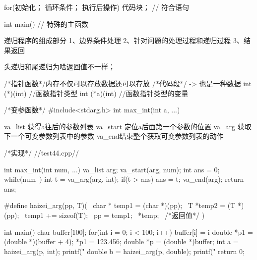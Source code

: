 for(初始化； 循环条件； 执行后操作)
{
	代码块； //  符合语句	
}


int main() // 特殊的主函数


递归程序的组成部分
1、边界条件处理
2、针对问题的处理过程和递归过程
3、结果返回

头递归和尾递归为啥返回值不一样；

/*指针函数*/内存不仅可以存放数据还可以存放  /*代码段*/ -> 也是一种数据 
int (*)(int) //函数指针类型
int (*a)(int)  //函数指针类型的变量

/*变参函数*/
#include<stdarg.h>
int max_int(int a, ...)

va_list 获得a往后的参数列表
va_start 定位a后面第一个参数的位置
va_arg 获取下一个可变参数列表中的参数
va_end结束整个获取可变参数列表的动作

/*实现*/  //test44.cpp//

int max_int(int num, ...)
{
	va_list arg;
	va_start(arg, num);
	int ans = 0;
	while(num--)
	{
		int t = va_arg(arg, int);
		if(t > ans)
			ans = t;
	}
	va_end(arg);
	return ans;
}


#define haizei_arg(pp, T)({ \
	char * temp1 = (char *)(pp); \
	T *temp2 = (T *)(pp); \
	temp1 += sizeof(T); \
	pp = temp1; \
	*temp; \  /*返回值*/
})

int main()
{
	char buffer[100];
	for(int i = 0; i < 100; i++)
	{
		buffer[i] = i %
	}
	double *p1 = (double *)(buffer + 4);
	*p1 = 123.456;
	double *p = (double *)buffer;
	int a = haizei_arg(p, int);
	printf("%
	double b = haizei_arg(p, double);
	printf("%
	return 0;
}


